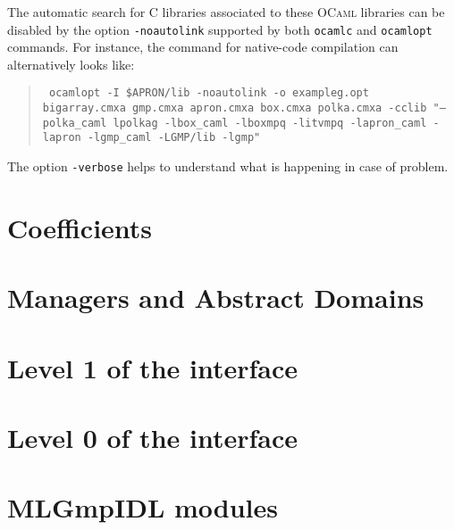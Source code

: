 \documentclass[twoside,10pt,a4paper]{report}
\begin{document}
The automatic search for C libraries associated to these
\textsc{OCaml} libraries can be disabled by the option
\texttt{-noautolink} supported by both \texttt{ocamlc} and
\texttt{ocamlopt} commands. For instance, the command for native-code compilation can alternatively looks like:
\begin{quote}\tt
  ocamlopt -I \$APRON/lib -noautolink -o exampleg.opt bigarray.cmxa gmp.cmxa apron.cmxa box.cmxa polka.cmxa -cclib "--polka\_caml lpolkag -lbox\_caml -lboxmpq -litvmpq -lapron\_caml -lapron -lgmp\_caml -LGMP/lib -lgmp"
\end{quote}

The option \texttt{-verbose} helps to understand what is happening
in case of problem.

\part{Coefficients}




\part{Managers and Abstract Domains}





\part{Level 1 of the interface}








\part{Level 0 of the interface}






\part{MLGmpIDL modules}








\appendix
\printindex
\end{document}
